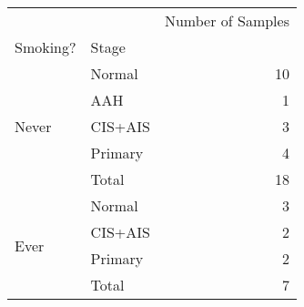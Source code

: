 \begin{tabular}{l|lr}
\toprule
     &       & Number of Samples \\
Smoking? & Stage &                   \\
\midrule
\multirow{5}{*}{Never} & Normal &                10 \\
     & AAH &                 1 \\
     & CIS+AIS &                 3 \\
     & Primary &                 4 \\
     & Total &                18 \\
\cline{1-3}
\multirow{4}{*}{Ever} & Normal &                 3 \\
     & CIS+AIS &                 2 \\
     & Primary &                 2 \\
     & Total &                 7 \\
\bottomrule
\end{tabular}
